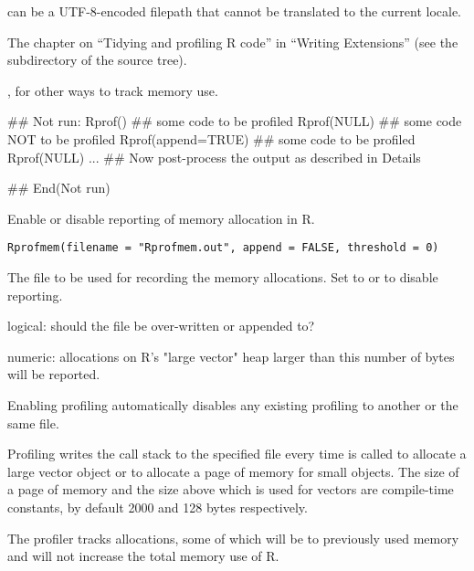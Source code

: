 %
\begin{Note}\relax
{} can be a UTF-8-encoded filepath that cannot be translated to
the current locale.
\end{Note}
%
\begin{SeeAlso}\relax
The chapter on ``Tidying and profiling R code'' in
``Writing \R{} Extensions'' (see the  subdirectory
of the \R{} source tree).


,  for other ways to track
memory use.
\end{SeeAlso}
%
\begin{Examples}
\begin{ExampleCode}
## Not run: Rprof()
## some code to be profiled
Rprof(NULL)
## some code NOT to be profiled
Rprof(append=TRUE)
## some code to be profiled
Rprof(NULL)
...
## Now post-process the output as described in Details

## End(Not run)
\end{ExampleCode}
\end{Examples}
%
\begin{Description}\relax
Enable or disable reporting of memory allocation in R.
\end{Description}
%
\begin{Usage}
\begin{verbatim}
Rprofmem(filename = "Rprofmem.out", append = FALSE, threshold = 0)
\end{verbatim}
\end{Usage}
%
\begin{Arguments}
\begin{ldescription}
\item[\code{filename}] The file to be used for recording the memory
allocations. Set to  or  to disable reporting. 
\item[\code{append}] logical: should the file be over-written or appended to? 
\item[\code{threshold}] numeric: allocations on R's "large vector" heap
larger than this number of bytes will be reported.

\end{ldescription}
\end{Arguments}
%
\begin{Details}\relax
Enabling profiling automatically disables any existing profiling to
another or the same file.

Profiling writes the call stack to the specified file every time
 is called to allocate a large vector object or to
allocate a page of memory for small objects. The size of a page of
memory and the size above which  is used for vectors are
compile-time constants, by default 2000 and 128 bytes respectively.

The profiler tracks allocations, some of which will be to previously
used memory and will not increase the total memory use of R.
\end{Details}
